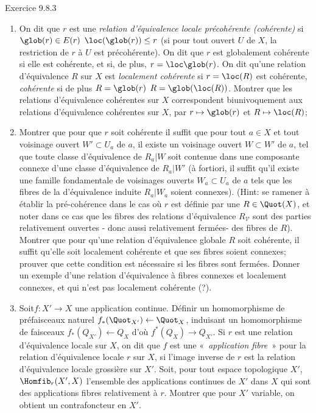 \documentclass[10pt]{../fichiers-configuration-latex/smfart}
\begin{document}
\begin{enonce*}[remark]{Exercice 9.8.3}
\begin{enumerate}
\item On dit que $r$ est une \emph{relation d'équivalence locale
précohérente (\resp cohérente)} si $\glob(r)\in E(r)$ \ie
$\loc(\glob(r))\leq r$ (\resp si pour tout ouvert $U$ de $X$, la
restriction de $r$ à $U$ est précohérente). On dit que $r$ est
globalement cohérente si elle est cohérente, et si, de plus, $r=\loc
\glob(r)$. On dit qu'une relation d'équivalence $R$ sur $X$ est
\emph{localement cohérente} si $r=\loc(R)$ est cohérente,
\emph{cohérente} si de plus $R=\glob(r)$ \ie $R=\glob(\loc(R))$.
Montrer que les relations d'équivalence 
cohérentes  sur $X$ correspondent biunivoquement aux relations
d'équivalence cohérentes  sur $X$, par $r\mapsto \glob(r)$ et
$R\mapsto \loc(R)$;

\item Montrer que pour que $r$ soit cohérente il suffit que pour tout
$a\in X$ et tout voisinage ouvert $W'\subset U_a$ de $a$, il existe
un voisinage ouvert $W\subset W'$ de $a$, tel que toute classe
d'équivalence de $R_a| W$ soit contenue dans une composante connexe
d'une classe d'équivalence de $R_a| W'$ (à fortiori, il suffit qu'il
existe une famille fondamentale de voisinages ouverts $W_a\subset
U_a$ de $a$ tels que les fibres de la  d'équivalence
induite $R_a| W_a$ soient connexes). (Hint: se ramener à établir la
pré-cohérence dans le cas où $r$ est définie par une $R\in
\Quot(X)$, et noter dans ce cas que les fibres des relations
d'équivalence $R_{𝒱}$ sont des parties relativement ouvertes
- donc aussi relativement fermées- des fibres de $R$). Montrer que
pour qu'une relation d'équivalence globale $R$ soit cohérente, il
suffit qu'elle soit localement cohérente et que ses fibres soient
connexes; prouver que cette condition est nécessaire si les fibres
sont fermées. Donner un exemple d'une relation d'équivalence à
fibres connexes et localement connexes, et qui n'est pas localement
cohérente (?).

\item Soit\pageoriginale $f:X'\rightarrow X$ une application
continue. Définir un homomorphisme de préfaisceaux naturel
$f_{\ast}(\Quot_{X'})\leftarrow \Quot_{X}$, induisant un
homomorphisme de faisceaux $f_{\ast}(Q_{X'})\leftarrow Q_X$ d'où
$f^{\ast}(Q_X)\rightarrow Q_{X'}$. Si $r$ est une relation
d'équivalence locale sur $X$, on dit que $f$ est une « \emph{application fibre} »  pour la relation d'équivalence locale
$r$ sur $X$, si l'image inverse de $r$ est la relation d'équivalence
locale grossière sur $X'$. Soit, pour tout espace topologique $X'$,
$\Homfib_r(X',X)$ l'ensemble des applications continues de $X'$ dans
$X$ qui sont des applications fibres relativement à $r$. Montrer que
pour $X'$ variable, on obtient un contrafoncteur en $X'$.


\end{enumerate}
\end{enonce*}
\end{document}
